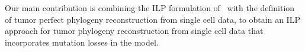 \documentclass[a4paper,USenglish]{article}
\theoremstyle{definition}
\newtheorem{definition}{Definition}
\begin{document}
Our main contribution is combining the ILP formulation
of~\cite{Bonizzoni:2017:BPP:3107411.3107441} with the definition of tumor perfect phylogeny
reconstruction from single cell data, to obtain an ILP approach for tumor phylogeny
reconstruction from single cell data that incorporates mutation losses in the model.






 
  
\end{document}
